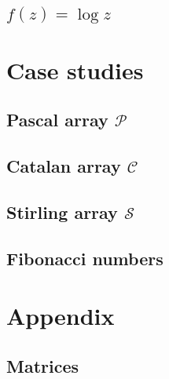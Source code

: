 

\subsection{$f(z)=\log{z}$}



\section{Case studies}

\subsection{Pascal array $\mathcal{P}$}



\subsection{Catalan array $\mathcal{C}$}



\subsection{Stirling array $\mathcal{S}$}



\subsection{Fibonacci numbers}



\section{Appendix}




\subsection*{Matrices}





